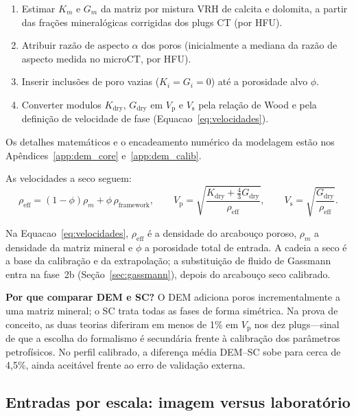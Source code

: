 \documentclass[11pt,a4paper]{article}
\numberwithin{equation}{section}
\newcommand{\Vp}{\ensuremath{V_{\mathrm{p}}}}
\newcommand{\Vs}{\ensuremath{V_{\mathrm{s}}}}
\begin{document}
\begin{enumerate}
  \item Estimar $K_m$ e $G_m$ da matriz por mistura VRH de calcita e dolomita,
        a partir das frações mineralógicas corrigidas dos plugs CT
        (por HFU).
  \item Atribuir razão de aspecto $\alpha$ dos poros (inicialmente a
        mediana da razão de aspecto medida no microCT, por HFU).
  \item Inserir inclusões de poro vazias ($K_i = G_i = 0$) até a porosidade
        alvo $\phi$.
  \item Converter modulos $K_{\mathrm{dry}}$, $G_{\mathrm{dry}}$ em \Vp{} e
        \Vs{} pela relação de Wood e pela definição de velocidade
        de fase (Equacao~\eqref{eq:velocidades}).
\end{enumerate}

Os detalhes matemáticos e o encadeamento numérico da modelagem estão nos
Apêndices~\ref{app:dem_core} e~\ref{app:dem_calib}.

As velocidades a seco seguem:
\begin{equation}
  \label{eq:velocidades}
  \rho_{\mathrm{eff}} = (1-\phi)\rho_m + \phi\,\rho_{\mathrm{framework}},
  \qquad
  \Vp = \sqrt{\frac{K_{\mathrm{dry}} + \frac{4}{3}G_{\mathrm{dry}}}{\rho_{\mathrm{eff}}}},
  \qquad
  \Vs = \sqrt{\frac{G_{\mathrm{dry}}}{\rho_{\mathrm{eff}}}}.
\end{equation}

Na Equacao~\eqref{eq:velocidades}, $\rho_{\mathrm{eff}}$ é a densidade do
arcabouço poroso, $\rho_m$ a densidade da matriz mineral e $\phi$ a
porosidade total de entrada.
A cadeia a seco é a base da calibração e da extrapolação; a substituição
de fluido de Gassmann entra na fase~2b (Seção~\ref{sec:gassmann}),
depois do arcabouço seco calibrado.

\textbf{Por que comparar DEM e SC?}
O DEM adiciona poros incrementalmente a uma matriz mineral; o SC trata todas as
fases de forma simétrica.
Na prova de conceito, as duas teorias diferiram em menos de 1\% em \Vp{} nos
dez plugs---sinal de que a escolha do formalismo é secundária frente à
calibração dos parâmetros petrofísicos.
No perfil calibrado, a diferença média DEM--SC sobe para cerca de 4,5\%,
ainda aceitável frente ao erro de validação externa.

\subsection{Entradas por escala: imagem versus laboratório}
\label{sec:entradas_escala}
\end{document}
